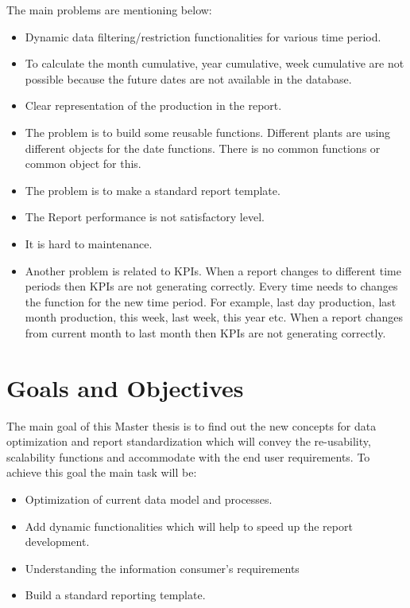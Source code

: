 The main problems are mentioning below: 

\begin{itemize}
\item Dynamic data filtering/restriction functionalities for various time period.
\item To calculate the month cumulative, year cumulative, week cumulative are not possible because the future dates are not available in the database.
\item Clear representation of the production in the report.
\item The problem is to build some reusable functions. Different plants are using  different objects for the date functions. There is no common functions or common object for this.
\item The problem is to make a standard report template.
\item The Report performance is not satisfactory level.
\item It is hard to maintenance.
\item Another problem is related to KPIs. When a report changes to different time periods then KPIs are not generating correctly. Every time needs to changes the function for the new time period. For example, last day production, last month production, this week, last week, this year etc. When a report changes from current month to last month then KPIs are not generating correctly.
\end{itemize}

\section{Goals and Objectives}
The main goal of this Master thesis is to find out the new concepts for data optimization and report standardization which will convey the re-usability, scalability functions and accommodate with the end user requirements. To achieve this goal the main task will be:\\

\begin{itemize}
\item  Optimization of current data model and processes.
\item  Add dynamic functionalities which will help to speed up the report development.
\item  Understanding the information consumer's requirements
\item  Build a standard reporting template.
\end{itemize}

